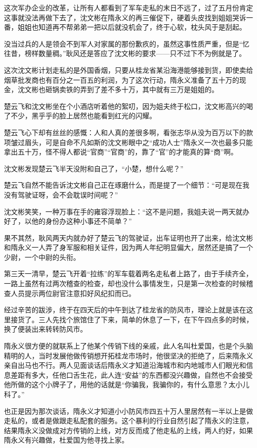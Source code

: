 这次军办企业的改革，让所有人都看到了军车走私的末日不远了，过了五月份肯定这事就没法再做下去了，沈文彬在隋永义的再三催促下，硬着头皮找到姐姐哭诉一番，姐姐也知道再不帮弟弟一把以后就没机会了，终于心软，枕头风于是刮起。

没当过兵的人是领会不到军人对家属的那份歉疚的，虽然这事性质严重，但是“忆往昔，榜样数量稠。”耿风还是答应了沈文彬的要求——只不过下不为例就是了。

这次沈文彬计划走私的是外国香烟，只要从桂龙省某沿海港能够接到货，即使卖给烟草批发商也有百分之一百五的利润，为了这次行动，隋永义准备了五十万的现金，沈文彬也砸锅卖铁的弄到了差不多十万，其中就有三万是姐姐的。

楚云飞和沈文彬坐在个小酒店听着他的絮叨，因为姐夫终于松口，沈文彬高兴的喝了不少，黑乎乎的脸上居然也能看到红光的闪耀。

楚云飞心下却有丝丝的感慨：人和人真的差很多啊，看张志华从没为百万以下的款项皱过眉头，可是自命不凡如斯的沈文彬眼中之“成功人士”隋永义一次也最多只能拿出五十万，怪不得人都说“官商”“官商”的，靠了“官”的才能真的算“商”啊。

沈文彬发现楚云飞半天没附和自己了，“小楚，想什么呢？”

楚云飞自然不能告诉沈文彬自己正在琢磨什么，而是提了一个细节：“可是现在我没有驾驶证呀，会不会耽误时间呢？”

沈文彬笑笑，一种万事在手的雍容浮现脸上：“这不是问题，我姐夫说一两天就办好了，以他的身份办这种小事还不简单？”

果不其然，耿风两天内就办好了楚云飞的驾驶证，出车证明也开了出来，给沈文彬和隋永义一人弄了身军服和相关证件，因为两人年纪明显偏大，居然还是搞了一个少尉，一个中尉的头衔。

第三天一清早，楚云飞开着“拉练”的军车载着两名走私者上路了，由于手续齐全，一路上虽然有过两次稽查的检查，却也没什么事情发生，只是第一次检查的时候稽查人员提示两位尉官注意扣好风纪扣而已。

经过辛苦的跋涉，终于在四天后的中午到达了桂龙省的防风市，理论上就是该在这里接货了。三人先找个旅馆住了下来，简单的休息了一下，在下午四点多的时候，换了便装出来转转防风市。

隋永义很方便的就联系上了他某个传销下线的亲戚，此人名叫杜爱国，也是个头脑精明的人，当时发展他做传销想开拓桂龙市场时，他很坚决的拒绝了，后来隋永义亲自出马也不行。两人见面谈话后隋永义才知道沿海城市和内地城市人们眼光和信息差距有多大，任他口舌生花，此人连“安益”的东西都没兴趣做，自然也不会接受他所做的这个小牌子了，用他的话就是“你骗我，我骗你的，有什么意思？太小儿科了。”

也正是因为那次谈话，隋永义才知道小小防风市四五十万人里居然有一半以上是做走私的，或者是做跟走私配套的服务。这个暴利的行业自然引起了隋永义的注意，结果隋永义没做成对方传销的上线，对方反而成了他走私的上线，两人约好，如果隋永义有兴趣做，杜爱国为他寻找上家。

